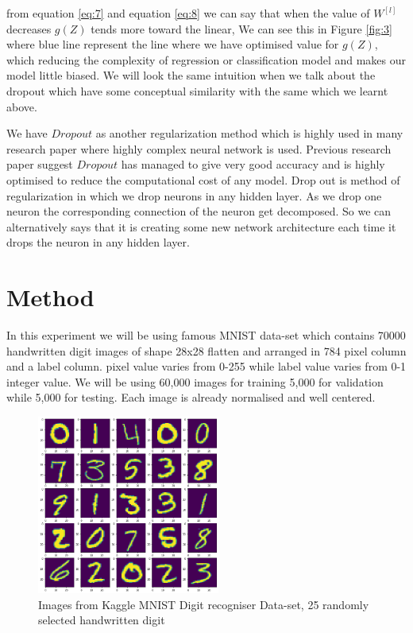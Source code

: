 \documentclass{article}
\begin{document}
\begin{multicols}{2}
from equation \ref{eq:7} and equation \ref{eq:8} we can say that when the value of $W^[l]$ decreases $g(Z)$ tends more toward the linear, We can see this in Figure \ref{fig:3} where blue line represent the line where we have optimised value for $g(Z)$, which reducing the complexity of regression or classification model and makes our model little biased. We will look the same intuition when we talk about the dropout which have some conceptual similarity with the same which we learnt above.

We have $Dropout$ as another regularization method which is highly used in many research paper where highly complex neural network is used. Previous research paper suggest $Dropout$ has managed to give very good accuracy and is highly optimised to reduce the computational cost of any model. Drop out is method of regularization in which we drop neurons in any hidden layer. As we drop one neuron the corresponding connection of the neuron get decomposed. So we can alternatively says that it is creating some new network architecture each time it drops the neuron in any hidden layer. 

\section{Method}

In this experiment we will be using famous MNIST data-set which contains 70000 handwritten digit images of shape 28x28 flatten and arranged in 784 pixel column and a label column. pixel value varies from 0-255 while label  value varies from 0-1 integer value. We will be using 60,000 images for training 5,000 for validation while 5,000 for testing. Each image is already normalised and well centered. 

\begin{figure}[H]
    \centering
    \includegraphics[width=6cm]{images/images.png}
    \caption{Images from Kaggle MNIST Digit recogniser Data-set, 25 randomly selected handwritten digit}
    \label{fig:4}
\end{figure}


\end{multicols}
\end{document}
